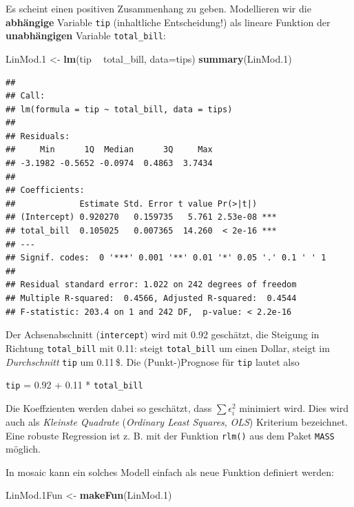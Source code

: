 \documentclass[12pt,ngerman,paper=a4,pagesize,DIV=13]{scrreprt}
\newenvironment{Shaded}{\begin{snugshade}}{\end{snugshade}}
\newcommand{\DataTypeTok}[1]{\textcolor[rgb]{0.13,0.29,0.53}{#1}}
\newcommand{\FloatTok}[1]{\textcolor[rgb]{0.00,0.00,0.81}{#1}}
\newcommand{\KeywordTok}[1]{\textcolor[rgb]{0.13,0.29,0.53}{\textbf{#1}}}
\newcommand{\NormalTok}[1]{#1}
\newcommand{\OperatorTok}[1]{\textcolor[rgb]{0.81,0.36,0.00}{\textbf{#1}}}
\newcommand{\StringTok}[1]{\textcolor[rgb]{0.31,0.60,0.02}{#1}}
\begin{document}
Es scheint einen positiven Zusammenhang zu geben. Modellieren wir die
\textbf{abhängige} Variable \texttt{tip} (inhaltliche Entscheidung!) als
lineare Funktion der \textbf{unabhängigen} Variable
\texttt{total\_bill}:

\begin{Shaded}
\begin{Highlighting}[]
\NormalTok{LinMod}\FloatTok{.1}\NormalTok{ <-}\StringTok{ }\KeywordTok{lm}\NormalTok{(tip }\OperatorTok{~}\StringTok{ }\NormalTok{total_bill, }\DataTypeTok{data=}\NormalTok{tips)}
\KeywordTok{summary}\NormalTok{(LinMod}\FloatTok{.1}\NormalTok{)}
\end{Highlighting}
\end{Shaded}

\begin{verbatim}
## 
## Call:
## lm(formula = tip ~ total_bill, data = tips)
## 
## Residuals:
##     Min      1Q  Median      3Q     Max 
## -3.1982 -0.5652 -0.0974  0.4863  3.7434 
## 
## Coefficients:
##             Estimate Std. Error t value Pr(>|t|)    
## (Intercept) 0.920270   0.159735   5.761 2.53e-08 ***
## total_bill  0.105025   0.007365  14.260  < 2e-16 ***
## ---
## Signif. codes:  0 '***' 0.001 '**' 0.01 '*' 0.05 '.' 0.1 ' ' 1
## 
## Residual standard error: 1.022 on 242 degrees of freedom
## Multiple R-squared:  0.4566, Adjusted R-squared:  0.4544 
## F-statistic: 203.4 on 1 and 242 DF,  p-value: < 2.2e-16
\end{verbatim}

Der Achsenabschnitt (\texttt{intercept}) wird mit 0.92 geschätzt, die
Steigung in Richtung \texttt{total\_bill} mit 0.11: steigt
\texttt{total\_bill} um einen Dollar, steigt im \emph{Durchschnitt}
\texttt{tip} um 0.11\(\,\)\$. Die (Punkt-)Prognose für \texttt{tip}
lautet also

\texttt{tip} = 0.92 + 0.11 * \texttt{total\_bill}

Die Koeffzienten werden dabei so geschätzt, dass \(\sum \epsilon_i^2\)
minimiert wird. Dies wird auch als \emph{Kleinste Quadrate}
(\emph{Ordinary Least Squares}, \emph{OLS}) Kriterium bezeichnet. Eine
robuste Regression ist z. B. mit der Funktion \texttt{rlm()} aus dem
Paket \texttt{MASS} möglich.

In mosaic kann ein solches Modell einfach als neue Funktion definiert
werden:

\begin{Shaded}
\begin{Highlighting}[]
\NormalTok{LinMod}\FloatTok{.1}\NormalTok{Fun <-}\StringTok{ }\KeywordTok{makeFun}\NormalTok{(LinMod}\FloatTok{.1}\NormalTok{)}
\end{Highlighting}
\end{Shaded}
\end{document}

